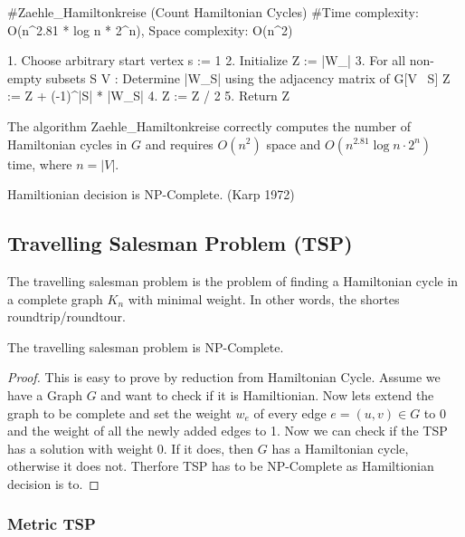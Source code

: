\begin{algorithm}
#Zaehle_Hamiltonkreise (Count Hamiltonian Cycles)
#Time complexity: O(n^2.81 * log n * 2^n), Space complexity: O(n^2)

1. Choose arbitrary start vertex s := 1
2. Initialize Z := |W_\emptyset|
3. For all non-empty subsets S \subseteq V :
    Determine |W_S| using the adjacency matrix of G[V \ S]
    Z := Z + (-1)^|S| * |W_S|
4. Z := Z / 2
5. Return Z
\end{algorithm}

\begin{theorem}
    The algorithm Zaehle\_Hamiltonkreise correctly computes the number of Hamiltonian cycles in $G$ and requires $O(n^2)$ space and $O(n^{2.81} \log n \cdot 2^n)$ time, where $n = |V|$.
\end{theorem}

\begin{theorem}
    Hamiltionian decision is NP-Complete. (Karp 1972)
\end{theorem}

\subsection{Travelling Salesman Problem (TSP)}

The travelling salesman problem is the problem of finding a Hamiltonian cycle in a complete graph $K_n$ with
minimal weight. In other words, the shortes roundtrip/roundtour.

\begin{theorem}
    The travelling salesman problem is NP-Complete. 
\end{theorem}

\begin{proof}
    This is easy to prove by reduction from Hamiltonian Cycle. Assume we have a
    Graph $G$ and want to check if it is Hamiltionian. Now lets extend the graph to be complete and set the
    weight $w_e$ of every edge $e = (u,v) \in G$ to 0 and the weight of all the newly added edges to 1. Now we
    can check if the TSP has a solution with weight 0. If it does, then $G$ has a Hamiltonian cycle, otherwise
    it does not. Therfore TSP has to be NP-Complete as Hamiltionian decision is to.
\end{proof}

\subsubsection{Metric TSP}

